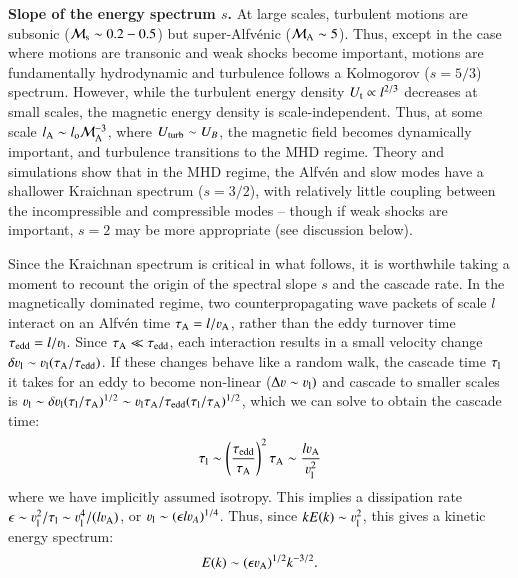 \documentclass[fleqn,usenatbib,useAMS]{mnras}
\begin{document}
{\bf Slope of the energy spectrum $s$.} At large scales, turbulent motions are subsonic (${\mathcal M}_{\rm s} \sim 0.2-0.5$) but super-Alfv{\'e}nic (${\mathcal M}_{\rm A} \sim 5$). Thus, except in the case where motions are transonic and weak shocks become important, motions are fundamentally hydrodynamic and turbulence follows a Kolmogorov ($s=5/3$) spectrum. However, while the turbulent energy density $U_{\rm t} \propto l^{2/3}$ decreases at small scales, the magnetic energy density is scale-independent. Thus, at some scale $l_{\rm A} \sim l_{\rm o} {\mathcal M}_{\rm A}^{-3}$, where $U_{\rm turb} \sim U_{B}$, the magnetic field becomes dynamically important, and turbulence transitions to the MHD regime. Theory \citep{goldreich95,chandran05} and simulations \citep{cho03} show that in the MHD regime, the Alfv{\'e}n and slow modes have a shallower Kraichnan spectrum ($s=3/2$), with relatively little coupling between the incompressible and compressible modes \citep{cho02,cho03} -- though if weak shocks are important, $s=2$ may be more appropriate (see discussion below). 

Since the Kraichnan spectrum is critical in what follows, it is worthwhile taking a moment to recount the origin of the spectral slope $s$ and the cascade rate. In the magnetically dominated regime, two counterpropagating wave packets of scale $l$ interact on an Alfv{\'e}n time $\tau_{\rm A}=l/\varv_{\rm A}$, rather than the eddy turnover time $\tau_{\rm edd} = l/\varv_{\rm l}$. 
Since $\tau_{\rm A} \ll \tau_{\rm edd}$, each interaction results in a small velocity change $\delta \varv_{\rm l} \sim \varv_{\rm l} (\tau_{\rm A}/\tau_{\rm edd})$. If these changes behave like a random walk, the cascade time $\tau_{\rm l}$ it takes for an eddy to become non-linear ($\Delta \varv \sim \varv_{\rm l})$ and cascade to smaller scales is $\varv_{\rm l} \sim \delta \varv_{\rm l} (\tau_{\rm l}/\tau_{\rm A})^{1/2} \sim \varv_{\rm l} \tau_{\rm A}/\tau_{\rm edd} (\tau_{\rm l}/\tau_{\rm A})^{1/2}$, which we can solve to obtain the cascade time: 
\begin{equation}
\tau_{\rm l} \sim \left(\frac{\tau_{\rm edd}}{\tau_{\rm A}}\right)^{2} \tau_{\rm A} \sim \frac{l \varv_{\rm A}}{\varv_{\rm l}^{2}} 
\label{eqn:cascade} 
\end{equation}
where we have implicitly assumed isotropy. This implies a dissipation rate $\epsilon \sim \varv_{\rm l}^{2}/\tau_{\rm l} \sim \varv_{\rm l}^{4}/(l \varv_{\rm A})$, or $\varv_{\rm l} \sim (\epsilon l \varv_{A})^{1/4}$. Thus, since $k E(k)\sim \varv_{\rm l}^{2}$, this gives a kinetic energy spectrum: 
\begin{equation}
E(k) \sim (\epsilon \varv_{\rm A})^{1/2} k^{-3/2}.
\end{equation}
 
\end{document}
